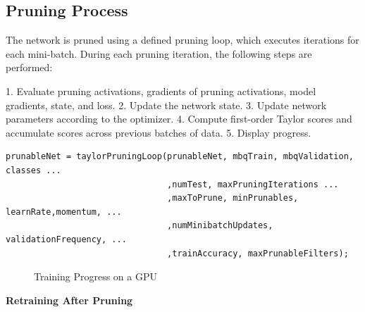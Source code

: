 \documentclass[a4paper]{report}
\begin{document}
{\subsection{Pruning Process}

The network is pruned using a defined pruning loop, which executes iterations for each mini-batch. During each pruning iteration, the following steps are performed:

1. Evaluate pruning activations, gradients of pruning activations, model gradients, state, and loss.
2. Update the network state.
3. Update network parameters according to the optimizer.
4. Compute first-order Taylor scores and accumulate scores across previous batches of data.
5. Display progress.

\begin{center}
\begin{tcolorbox}[breakable, enhanced, boxsep=10pt]
\begin{verbatim}
prunableNet = taylorPruningLoop(prunableNet, mbqTrain, mbqValidation, classes ...
                                ,numTest, maxPruningIterations ...
                                ,maxToPrune, minPrunables, learnRate,momentum, ...
                                ,numMinibatchUpdates, validationFrequency, ...
                                ,trainAccuracy, maxPrunableFilters);
\end{verbatim}
\end{tcolorbox}
\end{center}
\begin{figure}[H]
    \setlength{\fboxsep}{0pt} %
    \setlength{\fboxrule}{1pt} %
    \begin{center}
     \end{center} %
    \caption{Training Progress on a GPU}
    \label{fig:training}
\end{figure}
\textbf{Retraining After Pruning}

}
\end{document}
